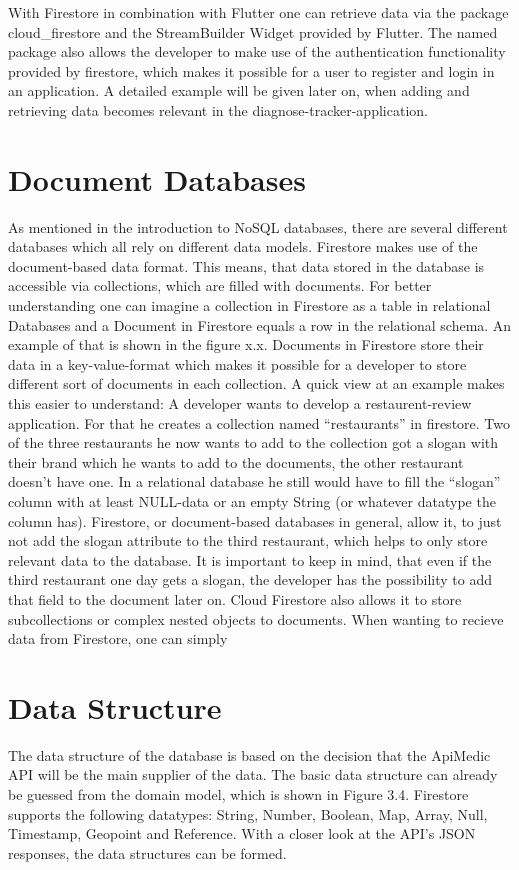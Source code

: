With Firestore in combination with Flutter one can retrieve data via the package cloud\_firestore and the StreamBuilder Widget provided by Flutter. The named package also allows the developer to make use of the authentication functionality provided by firestore, which makes it possible for a user to register and login in an application. A detailed example will be given later on, when adding and retrieving data becomes relevant in the diagnose-tracker-application. 

\section{Document Databases}
As mentioned in the introduction to NoSQL databases, there are several different databases which all rely on different data models. Firestore makes use of the document-based data format. This means, that data stored in the database is accessible via collections, which are filled with documents. For better understanding one can imagine a collection in Firestore as a table in relational Databases and a Document in Firestore equals a row in the relational schema. An example of that is shown in the figure x.x. Documents in Firestore store their data in a key-value-format which makes it possible for a developer to store different sort of documents in each collection. A quick view at an example makes this easier to understand: A developer wants to develop a restaurent-review application. For that he creates a collection named “restaurants” in firestore. Two of the three restaurants he now wants to add to the collection got a slogan with their brand which he wants to add to the documents, the other restaurant doesn’t have one. In a relational database he still would have to fill the “slogan” column with at least NULL-data or an empty String (or whatever datatype the column has). Firestore, or document-based databases in general, allow it, to just not add the slogan attribute to the third restaurant, which helps to only store relevant data to the database. It is important to keep in mind, that even if the third restaurant one day gets a slogan, the developer has the possibility to add that field to the document later on. Cloud Firestore also allows it to store subcollections or complex nested objects to documents. When wanting to recieve data from Firestore, one can simply 

\section{Data Structure}
The data structure of the database is based on the decision that the ApiMedic API will be the main supplier of the data. The basic data structure can already be guessed from the domain model, which is shown in Figure 3.4. Firestore supports the following datatypes: String, Number, Boolean, Map, Array, Null, Timestamp, Geopoint and Reference. With a closer look at the API's JSON responses, the data structures can be formed.

